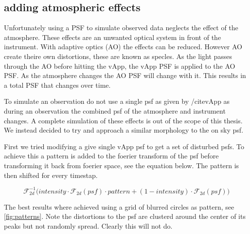 



\subsection{adding atmospheric effects}

Unfortunately using a PSF to simulate observed data neglects the effect of the atmosphere. These effects are an unwanted optical system in front of the instrument. With adaptive optics (AO) the effects can be reduced. However AO create theire own distortions, these are known as specles. As the light passes through the AO before hitting the vApp, the vApp PSF is applied to the AO PSF. As the atmosphere changes the AO PSF will change with it. This results in a total PSF that changes over time.

To simulate an observation do not use a single psf as given by /cite{vApp} as during an observation the combined psf of the atmosphere and instrument changes. A complete simulation of these effects is out of the scope of this thesis. We instead decided to try and approach a similar morphology to the on sky psf. 

First we tried modifying a give single vApp psf to get a set of disturbed psfs. To achieve this a pattern is added to the foerier transform of the psf before transforming it back from foerier space, see the equation below. The pattern is then shifted for every timestap.

\begin{equation}
\mathscr{F}_{2d}^{-1} \Big( intensity \cdot \mathscr{F}_{2d}(psf) \cdot pattern + (1-intensity) \cdot \mathscr{F}_{2d}(psf) \Big)
\end{equation}

The best results where achieved using a grid of blurred circles as pattern, see \autoref{fig:patterns}. Note the distortions to the psf are clusterd around the center of its peaks but not randomly spread. Clearly this will not do.


